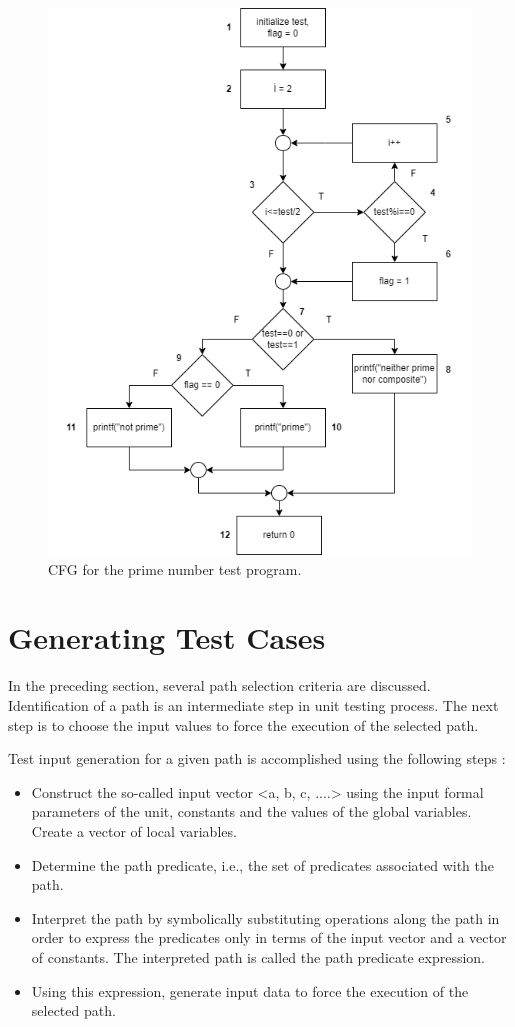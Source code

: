 \begin{figure}[!ht]
    \includegraphics{images/cfg-36.png}
    \caption{CFG for the prime number test program.}
\end{figure}


\section{Generating Test Cases}

In the preceding section, several path selection criteria are discussed. Identification of a path is an intermediate step in unit testing process. The next step is to choose the input values to force the execution of the selected path.

Test input generation for a given path is accomplished using the following steps \autocite{naik2011software}:
\begin{itemize}
	\item Construct the so-called input vector <a, b, c, ....> using the input formal parameters of the unit, constants and the values of the global variables. Create a vector of local variables.
    \item Determine the path predicate, i.e., the set of predicates associated with the path. 
    \item Interpret the path by symbolically substituting operations along the path in order to express the predicates only in terms of the input vector and a vector of constants. The interpreted path is called the path predicate expression.
    \item Using this expression, generate input data to force the execution of the selected path.
\end{itemize}

